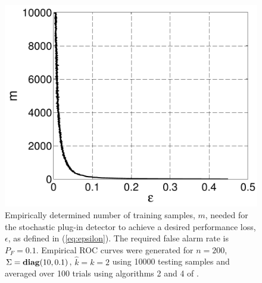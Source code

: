 \begin{figure}[t]
\centering
\includegraphics[width=\figwidth]{figures/asend2.pdf}
\vspace{-0.1in}
\caption{Empirically determined number of training samples, $m$,  needed for the stochastic plug-in detector to achieve a desired performance loss, $\epsilon$, as defined in (\ref{eq:epsilon}). The required false alarm rate is $P_F=0.1$. Empirical ROC curves were generated for $n=200$, $\Sigma=\mathop{\bf diag}(10,0.1)$, $\widehat{k}=k=2$ using 10000 testing samples and averaged over 100 trials using algorithms 2 and 4 of \cite{fawcett2006introduction}.}
\label{fig:epsilon_graph}
\vspace{-0.3in}
\end{figure}

